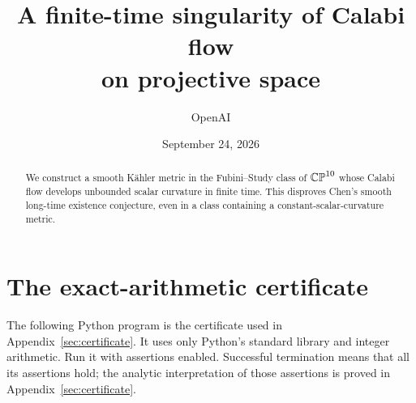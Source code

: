 \documentclass[11pt]{article}
\title{A finite-time singularity of Calabi flow\protect\\ on projective space}
\author{OpenAI}
\date{September 24, 2026}
\begin{document}
\maketitle
\begin{abstract}
We construct a smooth K\"ahler metric in the Fubini--Study class of
\(\mathbb{CP}^{10}\) whose Calabi flow develops unbounded scalar curvature in finite time.
This disproves Chen's smooth long-time existence conjecture, even in a class
containing a constant-scalar-curvature metric.
\end{abstract}






\appendix

\section{The exact-arithmetic certificate}\label{app:code}
The following Python program is the certificate used in
Appendix~\ref{sec:certificate}. It uses only Python's standard library and
integer arithmetic. Run it with assertions enabled. Successful termination
means that all its assertions hold; the analytic interpretation of those
assertions is proved in Appendix~\ref{sec:certificate}.

\begingroup
\small
\let\originalthebibliography\thebibliography
\renewcommand{\thebibliography}[1]{%
  \originalthebibliography{#1}%
  \setlength{\itemsep}{1pt}%
  \setlength{\parsep}{0pt}%
  \setlength{\parskip}{0pt}%
}


\endgroup
\end{document}
